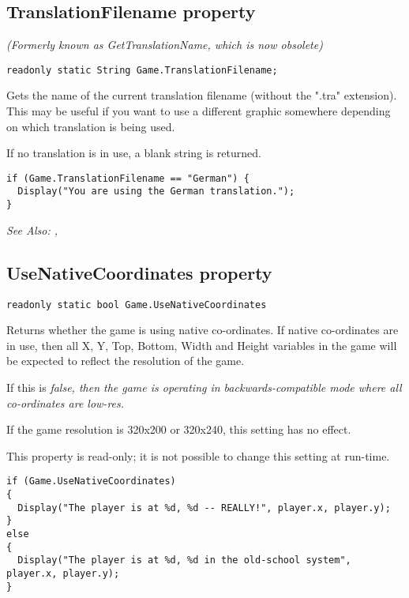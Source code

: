 \subsection{TranslationFilename property}\label{Game.TranslationFilename}%

\it{(Formerly known as GetTranslationName, which is now obsolete)}

\begin{verbatim}
readonly static String Game.TranslationFilename;
\end{verbatim}
Gets the name of the current translation filename (without the ".tra" extension).
This may be useful if you want to use a different graphic somewhere depending on
which translation is being used.

If no translation is in use, a blank string is returned.

\begin{verbatim}
if (Game.TranslationFilename == "German") {
  Display("You are using the German translation.");
}
\end{verbatim}

\it{See Also:} ,


\subsection{UseNativeCoordinates property}\label{Game.UseNativeCoordinates}%

\begin{verbatim}
readonly static bool Game.UseNativeCoordinates
\end{verbatim}
Returns whether the game is using native co-ordinates. If native co-ordinates are in use,
then all X, Y, Top, Bottom, Width and Height variables in the game will be expected to
reflect the resolution of the game.

If this is \it{false}, then the game is operating in backwards-compatible mode where
all co-ordinates are low-res.

If the game resolution is 320x200 or 320x240, this setting has no effect.

This property is read-only; it is not possible to change this setting at run-time.

\begin{verbatim}
if (Game.UseNativeCoordinates)
{
  Display("The player is at %d, %d -- REALLY!", player.x, player.y);
}
else
{
  Display("The player is at %d, %d in the old-school system", player.x, player.y);
}
\end{verbatim}

